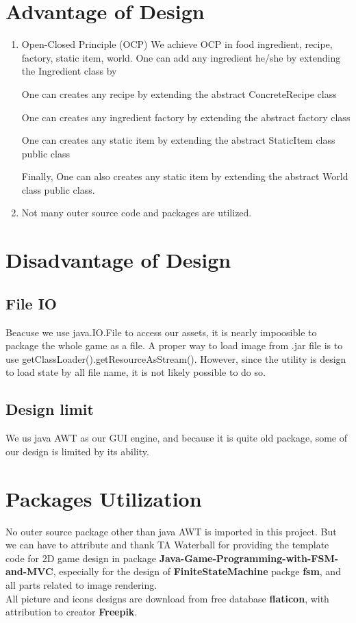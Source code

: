 \section{Advantage of Design}
\begin{enumerate}
\item Open-Closed Principle (OCP)
    We achieve OCP in food ingredient, recipe, factory, static item, world.
    One can add any ingredient he/she by extending the Ingredient class by 


One can creates any recipe by extending the abstract ConcreteRecipe class


One can creates any ingredient factory by extending the abstract factory class


One can creates any static item by extending the abstract StaticItem class public class


Finally, One can also creates any static item by extending the abstract World class public class.
\item Not many outer source code and packages are utilized.
\end{enumerate}

\section{Disadvantage of Design}
\subsection{File IO}
Beacuse we use java.IO.File to access our assets, it is nearly impoosible to package the whole game as a file.
A proper way to load image from .jar file is to use getClassLoader().getResourceAsStream(). However, since the utility is design to load state by
all file name, it is not likely possible to do so.
\subsection{Design limit}
We us java AWT as our GUI engine, and because it is quite old package, some of our design is limited by its ability.

\section{Packages Utilization}
No outer source package other than java AWT is imported in this project. But we can have to attribute and thank TA Waterball for providing the template code for 2D game design in package \textbf{Java-Game-Programming-with-FSM-and-MVC}, especially for the design of \textbf{FiniteStateMachine} packge \textbf{fsm}, and all parts related to image rendering.\\
All picture and icons designs are download from free database \textbf{flaticon}, with attribution to creator \textbf{Freepik}.

